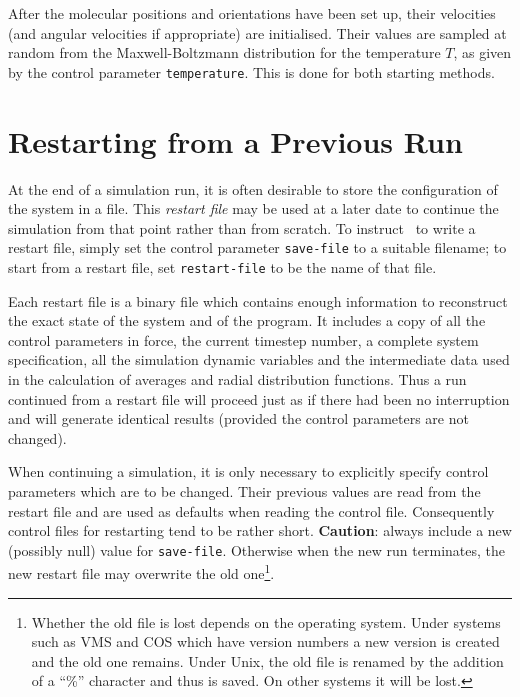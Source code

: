 After the molecular positions and orientations have been set up, their
velocities (and angular velocities if appropriate) are initialised.
Their values are sampled at random from the
Maxwell-Boltzmann distribution for the temperature $T$, as given by
the control parameter \verb'temperature'.  This is done for both
starting methods.

\section{Restarting from a Previous Run}
\label{sec:restarting}

At the end of a simulation run, it is often desirable to store the
configuration of the system in a file.  This {\em restart file} may be
used at a later date to continue the simulation from that point rather
than from scratch.  To instruct \moldy\  to write a restart file, simply
set the control parameter \verb'save-file' to a suitable filename; to
start from a restart file, set \verb'restart-file' to be the name of
that file.

Each restart file is a binary file which contains enough information
to reconstruct the exact state of the system and of the program.  It
includes a copy of all the control parameters in force, the current
timestep number, a complete system specification, all the simulation
dynamic variables and the intermediate data used in the calculation of
averages and radial distribution functions.  Thus a run continued from
a restart file will proceed just as if there had been no interruption
and will generate identical results (provided the control parameters
are not changed).

When continuing a simulation, it is only necessary to explicitly
specify control parameters which are to be changed.  Their previous
values are read from the restart file and are used as defaults when
reading the control file. Consequently control files for restarting
tend to be rather short. {\bf Caution}: always include a new (possibly
null) value for \verb'save-file'. Otherwise when the new run
terminates, the new restart file may overwrite the old one\footnote{
Whether the old file is lost depends on the operating system. Under
systems such as VMS and COS which have version numbers a new version
is created and the old one remains. Under Unix, the old file is
renamed by the addition of a ``\%'' character and thus is saved. On
other systems it will be lost.}.

